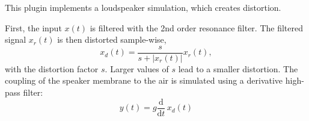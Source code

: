 This plugin implements a loudspeaker simulation, which creates distortion.

First, the input $x(t)$ is filtered with the 2nd order resonance
filter. The filtered signal $x_r(t)$ is then distorted sample-wise,
\begin{equation}
  x_d(t) = \frac{s}{s+|x_r(t)|} x_r(t),
\end{equation}
with the distortion factor $s$. Larger values of $s$ lead to a smaller
distortion. The coupling of the speaker membrane to the air is
simulated using a derivative high-pass filter:
\begin{equation}
  y(t) = g\frac{\textrm{d}}{\textrm{d}t}\,x_d(t)
\end{equation}


